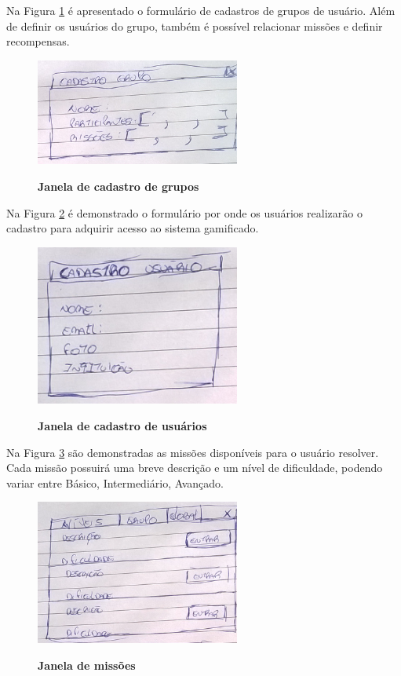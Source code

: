 \documentclass[
	12pt,				%
	oneside,			%
	a4paper,			%
	english,			%
	french,				%
	spanish,			%
	brazil,				%
	]{abntex2}
\begin{document}
Na Figura \ref{fig:janelaCadastro} é apresentado o formulário de cadastros de grupos de usuário. Além de definir os usuários do grupo, também é possível relacionar missões e definir recompensas.

\begin{figure}[ht]
\centering
\caption{\textbf{Janela de cadastro de grupos}}
\includegraphics[width=0.6\textwidth]{imagens/proposta_cadastro.png}
\sourceAuthor
\label{fig:janelaCadastro}
\end{figure}

Na Figura \ref{fig:janelaCadastrousuario} é demonstrado o formulário por onde os usuários realizarão o cadastro para adquirir acesso ao sistema gamificado.

\begin{figure}[ht]
\centering
\caption{\textbf{Janela de cadastro de usuários}}
\includegraphics[width=0.6\textwidth]{imagens/proposta_cadastro_usuario.png}
\sourceAuthor
\label{fig:janelaCadastrousuario}
\end{figure}

Na Figura \ref{fig:janelaMissoes} são demonstradas as missões disponíveis para o usuário resolver. Cada missão possuirá uma breve descrição e um nível de dificuldade, podendo variar entre Básico, Intermediário, Avançado.

\begin{figure}[ht]
\centering
\caption{\textbf{Janela de missões}}
\includegraphics[width=0.6\textwidth]{imagens/proposta_niveis.png}
\sourceAuthor
\label{fig:janelaMissoes}
\end{figure}
\end{document}

